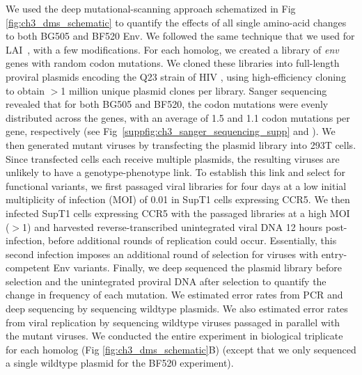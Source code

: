 \documentclass[9pt,lineno]{elife}
\begin{document}
We used the deep mutational-scanning approach schematized in Fig \ref{fig:ch3_dms_schematic} to quantify the effects of all single amino-acid changes to both BG505 and BF520 Env.
We followed the same technique that we used for LAI~\cite{haddox2016experimental}, with a few modifications.
For each homolog, we created a library of \textit{env} genes with random codon mutations.
We cloned these libraries into full-length proviral plasmids encoding the Q23 strain of HIV \cite{poss1999variants}, using high-efficiency cloning to obtain $>$1 million unique plasmid clones per library.
Sanger sequencing revealed that for both BG505 and BF520, the codon mutations were evenly distributed across the genes, with an average of 1.5 and 1.1 codon mutations per gene, respectively (see Fig~\ref{suppfig:ch3_sanger_sequencing_supp} and \cite{dingens2017comprehensive}).
We then generated mutant viruses by transfecting the plasmid library into 293T cells.
Since transfected cells each receive multiple plasmids, the resulting viruses are unlikely to have a genotype-phenotype link.
To establish this link and select for functional variants, we first passaged viral libraries for four days at a low initial multiplicity of infection (MOI) of 0.01 in SupT1 cells expressing CCR5.
We then infected SupT1 cells expressing CCR5 with the passaged libraries at a high MOI ($>$1) and harvested reverse-transcribed unintegrated viral DNA 12 hours post-infection, before additional rounds of replication could occur.
Essentially, this second infection imposes an additional round of selection for viruses with entry-competent Env variants.
Finally, we deep sequenced the plasmid library before selection and the unintegrated proviral DNA after selection to quantify the change in frequency of each mutation.
We estimated error rates from PCR and deep sequencing by sequencing wildtype plasmids.
We also estimated error rates from viral replication by sequencing wildtype viruses passaged in parallel with the mutant viruses.
We conducted the entire experiment in biological triplicate for each homolog (Fig \ref{fig:ch3_dms_schematic}B) (except that we only sequenced a single wildtype plasmid for the BF520 experiment).
\end{document}
